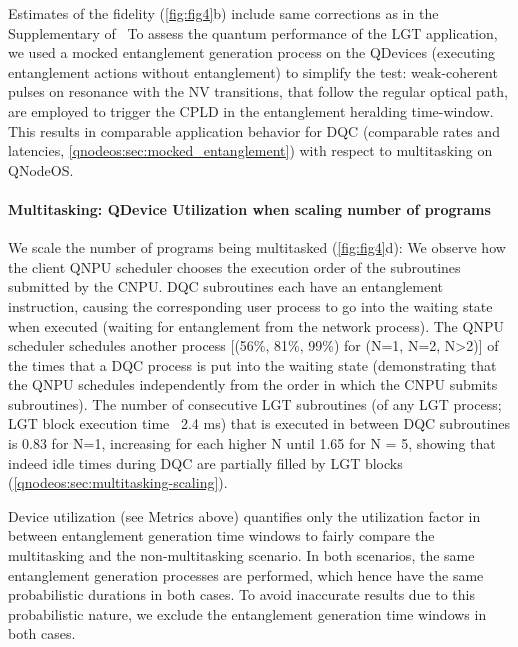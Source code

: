 Estimates of the fidelity (\cref{fig:fig4}b) include same corrections as in the Supplementary of~\cite{pompili_2021_multinode} To assess the quantum performance of the LGT application, we used a mocked entanglement generation process on the QDevices (executing entanglement actions without entanglement) to simplify the test: weak-coherent pulses on resonance with the NV transitions, that follow the regular optical path, are employed to trigger the CPLD in the entanglement heralding time-window. This results in comparable application behavior for DQC (comparable rates and latencies, \cref{qnodeos:sec:mocked_entanglement}) with respect to multitasking on QNodeOS.

\paragraph{Multitasking: QDevice Utilization when scaling number of programs}

We scale the number of programs being multitasked (\cref{fig:fig4}d): We observe how the client QNPU scheduler chooses the execution order of the subroutines submitted by the CNPU. DQC subroutines each have an entanglement instruction, causing the corresponding user process to go into the waiting state when executed (waiting for entanglement from the network process). The QNPU scheduler schedules another process [(56\%, 81\%, 99\%) for (N=1, N=2, N>2)] of the times that a DQC process is put into the waiting state (demonstrating that the QNPU schedules independently from the order in which the CNPU submits subroutines). The number of consecutive LGT subroutines (of any LGT process; LGT block execution time ~2.4 ms) that is executed in between DQC subroutines is 0.83 for N=1, increasing for each higher N until 1.65 for N = 5, showing that indeed idle times during DQC are partially filled by LGT blocks (\cref{qnodeos:sec:multitasking-scaling}).

Device utilization (see Metrics above) quantifies only the utilization factor in between entanglement generation time windows to fairly compare the multitasking and the non-multitasking scenario. In both scenarios, the same entanglement generation processes are performed, which hence have the same probabilistic durations in both cases. To avoid inaccurate results due to this probabilistic nature, we exclude the entanglement generation time windows in both cases.